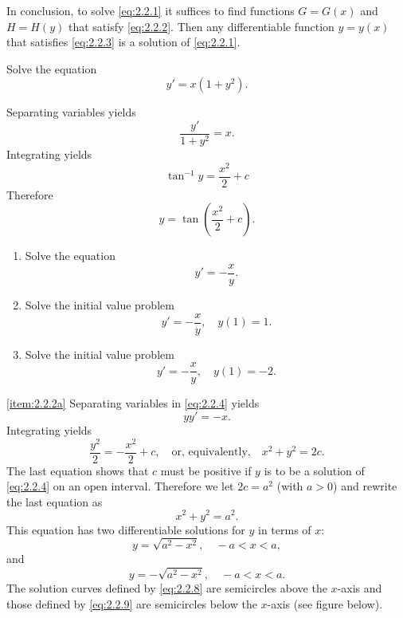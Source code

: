 \documentclass{ximera}
\begin{document}
In conclusion, to solve \eqref{eq:2.2.1} it suffices to find
functions $G=G(x)$ and $H=H(y)$ that satisfy \eqref{eq:2.2.2}.
Then any differentiable function  $y=y(x)$  that satisfies
\eqref{eq:2.2.3} is a solution of \eqref{eq:2.2.1}.
 
\begin{example}\label{example:2.2.1}
Solve the equation
$$
y'=x(1+y^2).
$$
\begin{explanation}
Separating variables
yields
$$
\frac{y'}{1+y^2}=x.
$$
Integrating yields
$$
\tan^{-1}y=\frac{x^2}{2}+c
$$
Therefore
$$
y=\tan\left(\frac{x^2}{2}+c\right).
$$
\end{explanation}
\end{example}
 
\begin{example}\label{example:2.2.2}
\begin{enumerate}
\item\label{item:2.2.2a}
Solve the equation
\begin{equation} \label{eq:2.2.4}
y'=-\frac{x}{y}.
\end{equation}
 
\item\label{item:2.2.2b}
Solve the initial value problem
\begin{equation} \label{eq:2.2.5}
y'=-\frac{x}{y}, \quad y(1)=1.
\end{equation}
 
\item \label{item:2.2.2c}
Solve the initial value problem
\begin{equation} \label{eq:2.2.6}
y'=-\frac{x}{y}, \quad y(1)=-2.
\end{equation}
\end{enumerate}
 
\begin{explanation}
\ref{item:2.2.2a} Separating variables
in \eqref{eq:2.2.4}  yields
$$
yy'=-x.
$$
Integrating yields
$$
\frac{y^2}{2}=-\frac{x^2}{2}+c,\quad\text{or, equivalently,}\quad
x^2+y^2=2c.
$$
The last equation shows that $c$ must be positive if $y$ is to be a
solution of \eqref{eq:2.2.4} on an open interval. Therefore we let
$2c=a^2$ (with $a > 0$) and rewrite the last equation as
\begin{equation} \label{eq:2.2.7}
x^2+y^2=a^2.
\end{equation}
 This equation has two differentiable solutions for $y$ in terms of
$x$:
\begin{equation} \label{eq:2.2.8}
y=\sqrt{a^2-x^2}, \quad -a < x < a,
\end{equation}
 and
\begin{equation} \label{eq:2.2.9}
y= - \sqrt{a^2-x^2}, \quad -a < x < a.
\end{equation}
The solution curves defined by \eqref{eq:2.2.8}  are semicircles
above the
$x$-axis and  those defined by \eqref{eq:2.2.9}  are semicircles below the
$x$-axis (see figure below).
 

\end{explanation}
\end{example}
\end{document}
